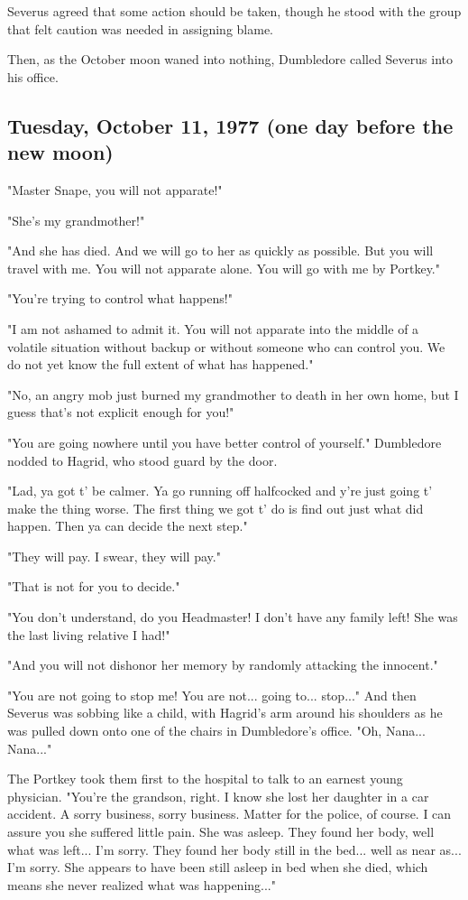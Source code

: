 Severus agreed that some action should be taken, though he stood with the group that felt caution was needed in assigning blame.

Then, as the October moon waned into nothing, Dumbledore called Severus into his office.


\subsection{Tuesday, October 11, 1977 (one day before the new moon)}

"Master Snape, you will not apparate!"

"She's my grandmother!"

"And she has died. And we will go to her as quickly as possible. But you will travel with me. You will not apparate alone. You will go with me by Portkey."

"You're trying to control what happens!"

"I am not ashamed to admit it. You will not apparate into the middle of a volatile situation without backup or without someone who can control you. We do not yet know the full extent of what has happened."

"No, an angry mob just burned my grandmother to death in her own home, but I guess that's not explicit enough for you!"

"You are going nowhere until you have better control of yourself." Dumbledore nodded to Hagrid, who stood guard by the door.

"Lad, ya got t' be calmer. Ya go running off halfcocked and y're just going t' make the thing worse. The first thing we got t' do is find out just what did happen. Then ya can decide the next step."

"They will pay. I swear, they will pay."

"That is not for you to decide."

"You don't understand, do you Headmaster! I don't have any family left! She was the last living relative I had!"

"And you will not dishonor her memory by randomly attacking the innocent."

"You are not going to stop me! You are not... going to... stop..." And then Severus was sobbing like a child, with Hagrid's arm around his shoulders as he was pulled down onto one of the chairs in Dumbledore's office. "Oh, Nana... Nana..."

The Portkey took them first to the hospital to talk to an earnest young physician. "You're the grandson, right. I know she lost her daughter in a car accident. A sorry business, sorry business. Matter for the police, of course. I can assure you she suffered little pain. She was asleep. They found her body, well what was left... I'm sorry. They found her body still in the bed... well as near as... I'm sorry. She appears to have been still asleep in bed when she died, which means she never realized what was happening..."

